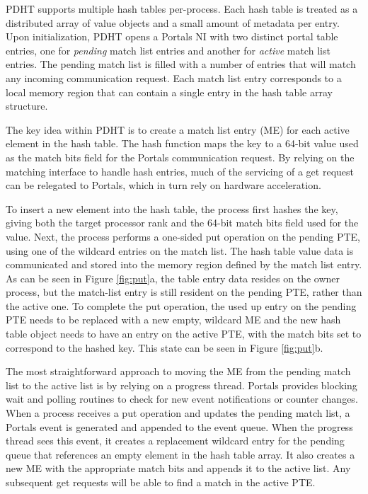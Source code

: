 PDHT supports multiple hash tables per-process. Each hash table is
treated as a distributed array of value objects and a small amount of
metadata per entry. Upon initialization, PDHT opens a Portals NI with
two distinct portal table entries, one for {\em pending} match list
entries and another for {\em active} match list entries. The pending
match list is filled with a number of entries that will match any
incoming communication request. Each match list entry corresponds to a
local memory region that can contain a single entry in the hash table
array structure.

The key idea within PDHT is to create a match list entry (ME) for each
active element in the hash table. The hash function maps the key to a
64-bit value used as the match bits field for the Portals
communication request. By relying on the matching interface to handle
hash entries, much of the servicing of a get request can be relegated
to Portals, which in turn rely on hardware acceleration.


To insert a new element into the hash table, the process first hashes
the key, giving both the target processor rank and the 64-bit match
bits field used for the value. Next, the process performs a one-sided
put operation on the pending PTE, using one of the wildcard entries on
the match list. The hash table value data is communicated and stored
into the memory region defined by the match list entry. As can be seen
in Figure \ref{fig:put}a, the table entry data resides on the owner
process, but the match-list entry is still resident on the pending
PTE, rather than the active one. To complete the put operation, the
used up entry on the pending PTE needs to be replaced with a new empty,
wildcard ME and the new hash table object needs to have an entry on
the active PTE, with the match bits set to correspond to the hashed
key. This state can be seen in Figure \ref{fig:put}b. 

The most straightforward approach to moving the ME from the pending 
match list to the active list is by relying on a progress
thread. Portals provides blocking wait and polling routines to check
for new event notifications or counter changes. When a process
receives a put operation and updates the pending match list, a Portals
event is generated and appended to the event queue. When the progress
thread sees this event, it creates a replacement wildcard entry for
the pending queue that references an empty element in the hash table
array. It also creates a new ME with the appropriate match bits and
appends it to the active list. Any subsequent get requests will be
able to find a match in the active PTE.


